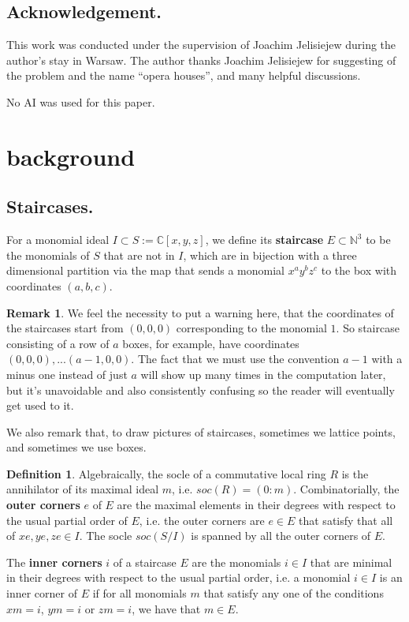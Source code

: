 \documentclass{amsart}[10pt]
\theoremstyle{plain}
\theoremstyle{definition}
\newtheorem{remark}[theorem]{Remark}
\newtheorem{definition}[theorem]{Definition}
\begin{document}
\subsection{Acknowledgement.} This work was conducted under the supervision of Joachim Jelisiejew during the author's stay in Warsaw. The author thanks Joachim Jelisiejew for suggesting of the problem and the name ``opera houses'', and many helpful discussions.

No AI was used for this paper.

\section{background}

\subsection{Staircases.\\}
For a monomial ideal $I \subset S:=\mathbb{C}[x,y,z]$, we define its
\textbf{staircase} $E \subset \mathbb{N}^3$ 
to be the monomials of $S$ that are not in $I$, which are in bijection with a three dimensional partition via the map that sends a monomial $x^ay^bz^c$ to the box with coordinates $(a,b,c)$. 

\begin{remark}
We feel the necessity to put a warning here, that the coordinates of the staircases start from $(0,0,0)$ corresponding to the monomial $1$. So staircase consisting of a row of $a$ boxes, for example, have coordinates $(0,0,0), ... (a-1, 0,0)$. The fact that we must use the convention $a -1$ with a minus one instead of just $a$ will show up many times in the computation later, but it's unavoidable and also consistently confusing so the reader will eventually get used to it.

We also remark that, to draw pictures of staircases, sometimes we lattice points, and sometimes we use boxes.
\end{remark}


\begin{definition}
Algebraically, the socle of a commutative local ring $R$ is the annihilator of its maximal ideal $m$, i.e.
$soc(R)=(0:m)$. Combinatorially, the \textbf{outer corners} $e$ of $E$ are the maximal
elements in their degrees with respect to the usual partial order of $E$, i.e. the outer corners are $e \in E$ that satisfy that all of $xe,ye,ze \in I$. 
The socle $soc(S/I)$ is spanned by all the outer corners of $E$.

The \textbf{inner corners} $i$ of a staircase $E$ are the monomials $i \in I$ that are minimal in their degrees with respect to the usual partial order, i.e. a monomial $i \in I$ is an inner corner of $E$ if for all monomials $m$ that satisfy any one of the conditions $xm=i$, $ym=i$ or $zm=i$, we have that $m \in E$.
\end{definition}
\end{document}
